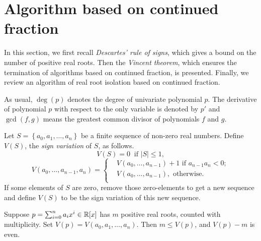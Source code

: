 
\section{Algorithm based on  continued fraction}
\label{sec:contalg}
In this section, we first recall {\em Descartes' rule of signs}, which gives a bound on the number of positive real roots. Then the {\em Vincent theorem}, which  ensures
the termination of algorithms based on  continued fraction, is presented. Finally, we review an algorithm of real root isolation based on  continued fraction.


As usual, $\deg(p)$ denotes the degree of univariate polynomial $p$. The derivative of polynomial $p$ with respect to the only variable is denoted by $p'$ and $\gcd(f,g)$ means the greatest common divisor of polynomials $f$ and $g$.

\begin{note}
Let $S=\left\{ a_0,a_1,\ldots,a_n \right\}$ be a finite sequence of non-zero real numbers. Define $V(S)$, the {\em sign variation} of $S$, as follows.
\[V(S)=0\ \text{ if } |S|\le1,\]
\[  V(a_0,\ldots,a_{n-1},a_n)=  \left\{\begin{aligned}
 &  V(a_0,\ldots,a_{n-1})+1 \text{ if }a_{n-1}a_n<0;\\
&V(a_0,\ldots,a_{n-1}), \text{ otherwise}.\\
	\end{aligned}
	\right.
\]
If some elements of $S$ are zero, remove those zero-elements to get a new sequence and define $V(S)$ to be the sign variation of this new sequence.
\end{note}





\begin{theorem} \label{thm:des}
  Suppose $p=\sum_{i=0}^na_ix^i\in{\mathbb R}[x]$ has $m$ positive real roots, counted with multiplicity. Set $V(p)=V(a_0,a_1,\ldots,a_n)$. Then $m\le V(p)$, and $V(p)-m$ is even.
\end{theorem}





